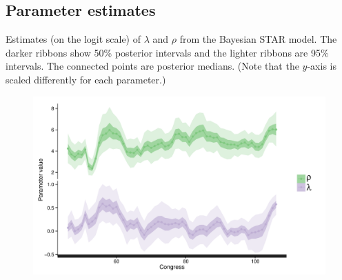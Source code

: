 \clearpage
\label{AppendixC}
\vspace{-1.75cm}
\subsection{Parameter estimates}

Estimates (on the logit scale) of $\lambda$ and $\rho$ from the Bayesian STAR model. 
The darker ribbons show 50\% posterior intervals and the lighter ribbons are 95\% 
intervals. The connected points are posterior medians. 
(Note that the $y$-axis is scaled differently for each parameter.) 

\vspace{.5cm}

\begin{figure}[h]
\centering
	\includegraphics[scale=0.8]{sections/figs/lambda_rho}
\label{fig:lambda_rho}
\end{figure}

